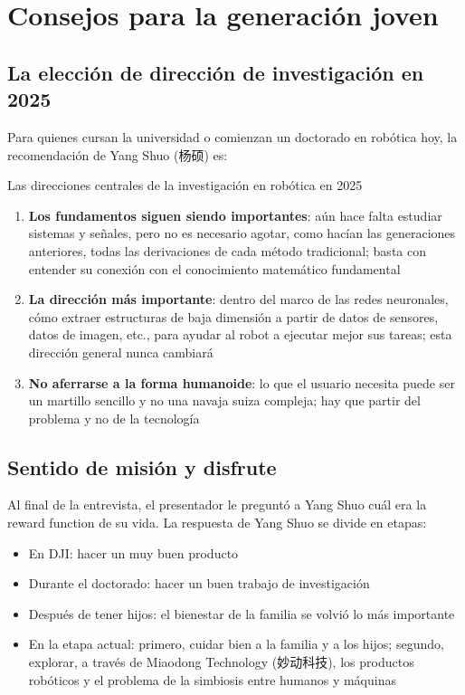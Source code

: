 \section{Consejos para la generación joven}

\subsection{La elección de dirección de investigación en 2025}

Para quienes cursan la universidad o comienzan un doctorado en robótica hoy, la recomendación de Yang Shuo (杨硕) es:

\begin{knowledgebox}{Las direcciones centrales de la investigación en robótica en 2025}
\begin{enumerate}
    \item \textbf{Los fundamentos siguen siendo importantes}: aún hace falta estudiar sistemas y señales, pero no es necesario agotar, como hacían las generaciones anteriores, todas las derivaciones de cada método tradicional; basta con entender su conexión con el conocimiento matemático fundamental
    \item \textbf{La dirección más importante}: dentro del marco de las redes neuronales, cómo extraer estructuras de baja dimensión a partir de datos de sensores, datos de imagen, etc., para ayudar al robot a ejecutar mejor sus tareas; esta dirección general nunca cambiará
    \item \textbf{No aferrarse a la forma humanoide}: lo que el usuario necesita puede ser un martillo sencillo y no una navaja suiza compleja; hay que partir del problema y no de la tecnología
\end{enumerate}
\end{knowledgebox}

\subsection{Sentido de misión y disfrute}

Al final de la entrevista, el presentador le preguntó a Yang Shuo cuál era la reward function de su vida. La respuesta de Yang Shuo se divide en etapas:
\begin{itemize}
    \item En DJI: hacer un muy buen producto
    \item Durante el doctorado: hacer un buen trabajo de investigación
    \item Después de tener hijos: el bienestar de la familia se volvió lo más importante
    \item En la etapa actual: primero, cuidar bien a la familia y a los hijos; segundo, explorar, a través de Miaodong Technology (妙动科技), los productos robóticos y el problema de la simbiosis entre humanos y máquinas
\end{itemize}

